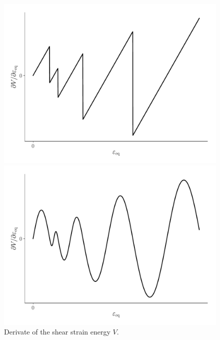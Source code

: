 \documentclass[times,namecite]{goose-article}
\begin{document}
\begin{figure}[htp]
  \centering
  \captionsetup[subfigure]{justification=centering}
  \begin{minipage}[t]{.49\textwidth}
    \centering
    \includegraphics[width=1.\textwidth]{figures/potential_dV-plas}
  \end{minipage}
  \hfill
  \begin{minipage}[t]{.49\textwidth}
    \centering
    \includegraphics[width=1.\textwidth]{figures/potential_dV-plas-smooth}
  \end{minipage}
  \caption{Derivate of the shear strain energy $V$.}
  \label{fig:dV-plas}
\end{figure}
\end{document}
